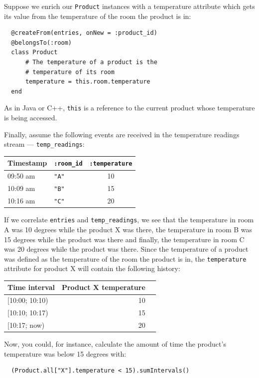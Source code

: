 \documentclass{report}
\begin{document}
Suppose we enrich our \verb=Product= instances with a temperature
attribute which gets its value from the temperature of the room the
product is in:


\begin{lstlisting}
  @createFrom(entries, onNew = :product_id)
  @belongsTo(:room)
  class Product
      # The temperature of a product is the
      # temperature of its room
      temperature = this.room.temperature
  end
\end{lstlisting}

As in Java or C++, \verb=this= is a reference to the current product
whose temperature is being accessed.

Finally, assume the following events are received in the temperature
readings stream --- \verb=temp_readings=:

\begin{tabular}{ |l|l|c| }
  \hline
  Timestamp & \verb=:room_id= & \verb=:temperature= \\
  \hline
  09:50 am & \verb="A"= & 10 \\
  10:09 am & \verb="B"= & 15 \\
  10:16 am & \verb="C"= & 20 \\
  \hline
\end{tabular}

If we correlate \verb=entries= and \verb=temp_readings=, we see that
the temperature in room A was 10 degrees while the product X was
there, the temperature in room B was 15 degrees while the product was
there and finally, the temperature in room C was 20 degrees while the
product was there. Since the temperature of a product was defined as
the temperature of the room the product is in, the \verb=temperature=
attribute for product X will contain the following history:

\begin{tabular}{ |l|r|r| }
  \hline
 Time interval & Product X temperature \\
  \hline
  $[$10:00; 10:10) & 10 \\
  $[$10:10; 10:17) & 15 \\
  $[$10:17;   now) & 20 \\
  \hline
\end{tabular}

Now, you could, for instance, calculate the amount of time the
product's temperature was below 15 degrees with:

\begin{lstlisting}
  (Product.all["X"].temperature < 15).sumIntervals()
\end{lstlisting}
\end{document}
